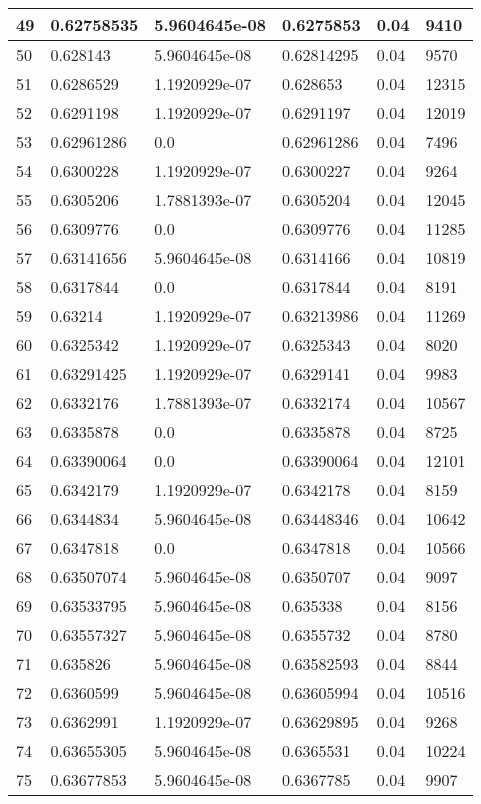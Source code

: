 \begin{longtable}{|l|l|l|l|l|l|}
49 & 0.62758535 & 5.9604645e-08 & 0.6275853 & 0.04 & 9410 \\ \hline 
50 & 0.628143 & 5.9604645e-08 & 0.62814295 & 0.04 & 9570 \\ \hline 
51 & 0.6286529 & 1.1920929e-07 & 0.628653 & 0.04 & 12315 \\ \hline 
52 & 0.6291198 & 1.1920929e-07 & 0.6291197 & 0.04 & 12019 \\ \hline 
53 & 0.62961286 & 0.0 & 0.62961286 & 0.04 & 7496 \\ \hline 
54 & 0.6300228 & 1.1920929e-07 & 0.6300227 & 0.04 & 9264 \\ \hline 
55 & 0.6305206 & 1.7881393e-07 & 0.6305204 & 0.04 & 12045 \\ \hline 
56 & 0.6309776 & 0.0 & 0.6309776 & 0.04 & 11285 \\ \hline 
57 & 0.63141656 & 5.9604645e-08 & 0.6314166 & 0.04 & 10819 \\ \hline 
58 & 0.6317844 & 0.0 & 0.6317844 & 0.04 & 8191 \\ \hline 
59 & 0.63214 & 1.1920929e-07 & 0.63213986 & 0.04 & 11269 \\ \hline 
60 & 0.6325342 & 1.1920929e-07 & 0.6325343 & 0.04 & 8020 \\ \hline 
61 & 0.63291425 & 1.1920929e-07 & 0.6329141 & 0.04 & 9983 \\ \hline 
62 & 0.6332176 & 1.7881393e-07 & 0.6332174 & 0.04 & 10567 \\ \hline 
63 & 0.6335878 & 0.0 & 0.6335878 & 0.04 & 8725 \\ \hline 
64 & 0.63390064 & 0.0 & 0.63390064 & 0.04 & 12101 \\ \hline 
65 & 0.6342179 & 1.1920929e-07 & 0.6342178 & 0.04 & 8159 \\ \hline 
66 & 0.6344834 & 5.9604645e-08 & 0.63448346 & 0.04 & 10642 \\ \hline 
67 & 0.6347818 & 0.0 & 0.6347818 & 0.04 & 10566 \\ \hline 
68 & 0.63507074 & 5.9604645e-08 & 0.6350707 & 0.04 & 9097 \\ \hline 
69 & 0.63533795 & 5.9604645e-08 & 0.635338 & 0.04 & 8156 \\ \hline 
70 & 0.63557327 & 5.9604645e-08 & 0.6355732 & 0.04 & 8780 \\ \hline 
71 & 0.635826 & 5.9604645e-08 & 0.63582593 & 0.04 & 8844 \\ \hline 
72 & 0.6360599 & 5.9604645e-08 & 0.63605994 & 0.04 & 10516 \\ \hline 
73 & 0.6362991 & 1.1920929e-07 & 0.63629895 & 0.04 & 9268 \\ \hline 
74 & 0.63655305 & 5.9604645e-08 & 0.6365531 & 0.04 & 10224 \\ \hline 
75 & 0.63677853 & 5.9604645e-08 & 0.6367785 & 0.04 & 9907 \\ \hline 
\end{longtable}